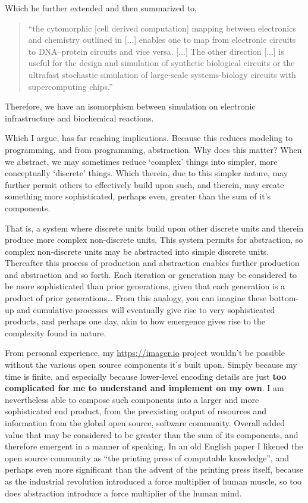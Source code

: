 Which he further extended and then summarized to, \begin{quotation}
    ``the cytomorphic [cell derived computation] mapping between electronics and chemistry outlined in [...] enables one to map from electronic circuits to DNA–protein circuits and vice versa. [...] The other direction [...] is useful for the design and simulation of synthetic biological circuits or the ultrafast stochastic simulation of large-scale systems-biology circuits with supercomputing chips.''
\end{quotation}

Therefore, we have an isomorphism between simulation on electronic infrastructure and biochemical reactions.

Which I argue, has far reaching implications. Because this reduces modeling to programming, and from programming, abstraction. Why does this matter? When we abstract, we may sometimes reduce `complex' things into simpler, more conceptually `discrete' things. Which therein, due to this simpler nature, may further permit others to effectively build upon such, and therein, may create something more sophisticated, perhaps even, greater than the sum of it's components.

That is, a system where discrete units build upon other discrete units and therein produce more complex non-discrete units. This system permits for abstraction, so complex non-discrete units may be abstracted into simple discrete units. Thereafter this process of production and abstraction enables further production and abstraction and so forth. Each iteration or generation may be considered to be more sophisticated than prior generations, given that each generation is a product of prior generations… From this analogy, you can imagine these bottom-up and cumulative processes will eventually give rise to very sophisticated products, and perhaps one day, akin to how emergence gives rise to the complexity found in nature.

From personal experience, my \url{https://imager.io} project wouldn’t be possible without the various open source components it’s built upon. Simply because my time is finite, and especially because lower-level encoding details are just \textbf{too complicated for me to understand and implement on my own}. I am nevertheless able to compose such components into a larger and more sophisticated end product, from the preexisting output of resources and information from the global open source, software community. Overall added value that may be considered to be greater than the sum of its components, and therefore emergent in a manner of speaking. In an old English paper I likened the open source community as ``the printing press of computable knowledge'', and perhaps even more significant than the advent of the printing press itself, because as the industrial revolution introduced a force multiplier of human muscle, so too does abstraction introduce a force multiplier of the human mind.


